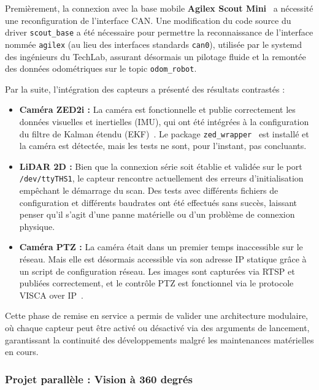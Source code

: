 \documentclass[12pt,a4paper]{article}
\begin{document}
Premièrement, la connexion avec la base mobile \textbf{Agilex Scout Mini}~\cite{scout_ros2} a nécessité une reconfiguration de l'interface CAN. Une modification du code source du driver \texttt{scout\_base} a été nécessaire pour permettre la reconnaissance de l'interface nommée \texttt{agilex} (au lieu des interfaces standards \texttt{can0}), utilisée par le systemd des ingénieurs du TechLab, assurant désormais un pilotage fluide et la remontée des données odométriques sur le topic \texttt{odom\_robot}.

Par la suite, l'intégration des capteurs a présenté des résultats contrastés : 
\begin{itemize} 
    \item \textbf{Caméra ZED2i :} La caméra est fonctionnelle et publie correctement les données visuelles et inertielles (IMU), qui ont été intégrées à la configuration du filtre de Kalman étendu (EKF)~\cite{robot_localization}. Le package \texttt{zed\_wrapper}~\cite{zed_ros2_wrapper} est installé et la caméra est détectée, mais les tests ne sont, pour l'instant, pas concluants.
    \item \textbf{LiDAR 2D :} Bien que la connexion série soit établie et validée sur le port \texttt{/dev/ttyTHS1}, le capteur rencontre actuellement des erreurs d'initialisation empêchant le démarrage du scan. Des tests avec différents fichiers de configuration et différents baudrates ont été effectués sans succès, laissant penser qu'il s'agit d'une panne matérielle ou d'un problème de connexion physique. 
    \item \textbf{Caméra PTZ :} La caméra était dans un premier temps inaccessible sur le réseau. Mais elle est désormais accessible via son adresse IP statique grâce à un script de configuration réseau. Les images sont capturées via RTSP et publiées correctement, et le contrôle PTZ est fonctionnel via le protocole VISCA over IP~\cite{marshall_cv605}.
\end{itemize}

Cette phase de remise en service a permis de valider une architecture modulaire, où chaque capteur peut être activé ou désactivé via des arguments de lancement, garantissant la continuité des développements malgré les maintenances matérielles en cours.

\subsubsection{Projet parallèle : Vision à 360 degrés}
\end{document}
